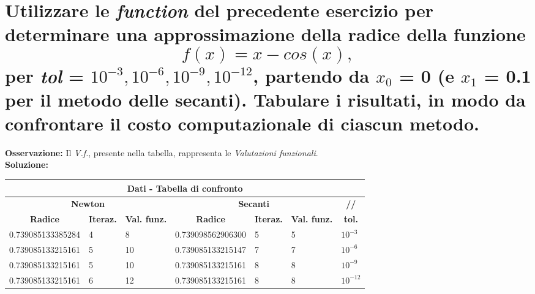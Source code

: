 \documentclass[10pt,a4paper]{article}
\begin{document}
\section{Utilizzare le \textit{function} del precedente esercizio per determinare una approssimazione
  della radice della funzione $$ f(x) = x - cos(x), $$ per \textit{tol} = $ 10^{-3}, 10^{-6}, 10^{-9}, 10^{-12} $,
  partendo da $ x_0 $ = 0 (e $ x_1 $ = 0.1 per il metodo delle secanti).
  Tabulare i risultati, in modo da confrontare il costo computazionale di ciascun metodo.}
\textbf{Osservazione:} Il \textit{V.f.}, presente nella tabella, rappresenta le \textit{Valutazioni funzionali}.\\
\textbf{Soluzione:}
\begin{center}
  \setlength\tabcolsep{2pt}
  \begin{tabular}{|p{3.5cm} | p{1cm} | p{1cm} | p{3.5cm} | p{1cm} | p{1cm} | p{1cm}|}
    \hline
    \multicolumn{7}{|c|}{\textbf{Dati - Tabella di confronto}}                                                                                                                                    \\
    \hline
    \multicolumn{3}{|c|}{\textbf{Newton}} & \multicolumn{3}{|c|}{\textbf{Secanti}} & \multicolumn{1}{c|}{\textbf{//}}                                                                             \\
    \hline
    \multicolumn{1}{|c|}{\textbf{Radice}} & \multicolumn{1}{|c|}{\textbf{Iteraz.}} & \multicolumn{1}{|c|}{\textbf{Val. funz.}}
                                          & \multicolumn{1}{|c|}{\textbf{Radice}}  & \multicolumn{1}{|c|}{\textbf{Iteraz.}}    & \multicolumn{1}{|c|}{\textbf{Val. funz.}}
                                          & \multicolumn{1}{c|}{\textbf{tol.}}                                                                                                                    \\
    \hline
    0.739085133385284                     & 4                                      & 8                                         & 0.739098562906300                         & 5 & 5 & $ 10^{-3} $  \\
    0.739085133215161                     & 5                                      & 10                                        & 0.739085133215147                         & 7 & 7 & $ 10^{-6} $  \\
    0.739085133215161                     & 5                                      & 10                                        & 0.739085133215161                         & 8 & 8 & $ 10^{-9} $  \\
    0.739085133215161                     & 6                                      & 12                                        & 0.739085133215161                         & 8 & 8 & $ 10^{-12} $ \\
    \hline
  \end{tabular}
  \newline
\end{center}
\end{document}
